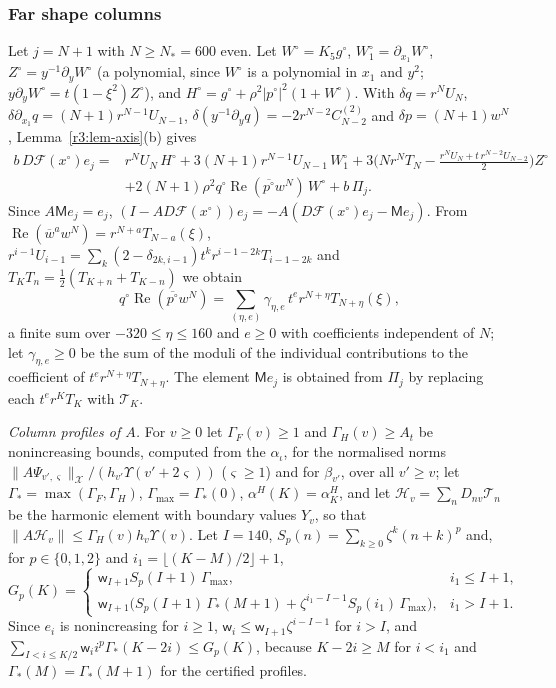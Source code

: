 \documentclass[11pt]{amsart}
\theoremstyle{definition}
\theoremstyle{remark}
\numberwithin{equation}{section}
\newcommand{\Fc}{\mathcal{F}}
\newcommand{\bw}{\overline{w}}
\DeclareMathOperator{\re}{Re}
\newcommand{\nrm}[1]{\lVert #1\rVert}
\begin{document}
\subsubsection*{Far shape columns}
Let $j=N+1$ with $N\geq N_*=600$ even. Let $W^\circ=K_5g^\circ$, $W^\circ_1=\partial_{x_1}W^\circ$, $Z^\circ=y^{-1}\partial_yW^\circ$ (a polynomial, since $W^\circ$ is a polynomial in $x_1$ and $y^2$; $y\partial_yW^\circ=t(1-\xi^2)Z^\circ$), and $H^\circ=g^\circ+\rho^2|p^\circ|^2(1+W^\circ)$. With $\delta q=r^NU_N$, $\delta\partial_{x_1}q=(N+1)r^{N-1}U_{N-1}$, $\delta(y^{-1}\partial_yq)=-2r^{N-2}C^{(2)}_{N-2}$ and $\delta p=(N+1)w^N$, Lemma~\ref{r3:lem-axis}(b) gives
\begin{equation}\label{r5:eq-farcol}
\begin{split}
b\,D\Fc(x^\circ)e_j={}&r^NU_N\,H^\circ+3(N+1)r^{N-1}U_{N-1}\,W^\circ_1+3\Big(Nr^NT_N-\frac{r^NU_N+t\,r^{N-2}U_{N-2}}2\Big)Z^\circ\\
&+2(N+1)\rho^2q^\circ\re(\overline{p^\circ}w^N)\,W^\circ+b\,\Pi_j .
\end{split}
\end{equation}
Since $A\mathsf Me_j=e_j$, $(I-AD\Fc(x^\circ))e_j=-A(D\Fc(x^\circ)e_j-\mathsf Me_j)$. From $\re(\bw^aw^N)=r^{N+a}T_{N-a}(\xi)$, $r^{i-1}U_{i-1}=\sum_k(2-\delta_{2k,i-1})t^kr^{i-1-2k}T_{i-1-2k}$ and $T_KT_n=\frac12(T_{K+n}+T_{K-n})$ we obtain
\[
q^\circ\re(\overline{p^\circ}w^N)=\sum_{(\eta,e)}\gamma_{\eta,e}\,t^er^{N+\eta}T_{N+\eta}(\xi),
\]
a finite sum over $-320\leq\eta\leq160$ and $e\geq0$ with coefficients independent of $N$; let $\gamma_{\eta,e}\geq0$ be the sum of the moduli of the individual contributions to the coefficient of $t^er^{N+\eta}T_{N+\eta}$. The element $\mathsf Me_j$ is obtained from $\Pi_j$ by replacing each $t^er^KT_K$ with $\mathcal T_K$.

\emph{Column profiles of $A$.} For $v\geq0$ let $\Gamma_F(v)\geq1$ and $\Gamma_H(v)\geq A_t$ be nonincreasing bounds, computed from the $\alpha_\iota$, for the normalised norms $\nrm{A\Psi_{v',\varsigma}}_{\mathcal X}/(h_{v'}\Upsilon(v'+2\varsigma))$ ($\varsigma\geq1$) and for $\beta_{v'}$, over all $v'\geq v$; let $\Gamma_*=\max(\Gamma_F,\Gamma_H)$, $\Gamma_{\max}=\Gamma_*(0)$, $\alpha^H(K)=\alpha^H_K$, and let $\mathcal H_v=\sum_nD_{nv}\mathcal T_n$ be the harmonic element with boundary values $Y_v$, so that $\nrm{A\mathcal H_v}\leq\Gamma_H(v)h_v\Upsilon(v)$. Let $I=140$, $S_p(n)=\sum_{k\geq0}\zeta^k(n+k)^p$ and, for $p\in\{0,1,2\}$ and $i_1=\lfloor(K-M)/2\rfloor+1$,
\[
G_p(K)=\begin{cases}\mathsf w_{I+1}S_p(I+1)\,\Gamma_{\max},&i_1\leq I+1,\\ \mathsf w_{I+1}\big(S_p(I+1)\,\Gamma_*(M+1)+\zeta^{i_1-I-1}S_p(i_1)\,\Gamma_{\max}\big),&i_1>I+1.\end{cases}
\]
Since $e_i$ is nonincreasing for $i\geq1$, $\mathsf w_i\leq\mathsf w_{I+1}\zeta^{i-I-1}$ for $i>I$, and $\sum_{I<i\leq K/2}\mathsf w_ii^p\Gamma_*(K-2i)\leq G_p(K)$, because $K-2i\geq M$ for $i<i_1$ and $\Gamma_*(M)=\Gamma_*(M+1)$ for the certified profiles.
\end{document}
